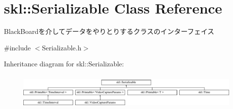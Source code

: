 \hypertarget{classskl_1_1_serializable}{}\section{skl\+:\+:Serializable Class Reference}
\label{classskl_1_1_serializable}


Black\+Boardを介してデータをやりとりするクラスのインターフェイス  




{\ttfamily \#include $<$Serializable.\+h$>$}

Inheritance diagram for skl\+:\+:Serializable\+:\begin{figure}[H]
\begin{center}
\leavevmode
\includegraphics[height=1.787234cm]{classskl_1_1_serializable}
\end{center}
\end{figure}
